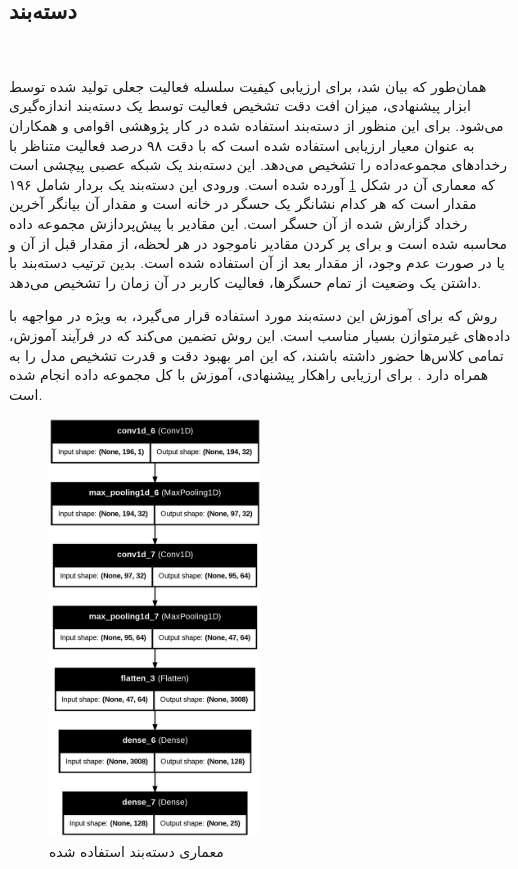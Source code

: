 \subsection{دسته‌بند}‌

همان‌طور که بیان شد، برای ارزیابی کیفیت سلسله فعالیت‌ جعلی تولید شده توسط ابزار پیشنهادی، میزان افت دقت تشخیص فعالیت توسط یک دسته‌بند اندازه‌گیری می‌شود. برای این منظور از دسته‌بند استفاده شده در کار پژوهشی اقوامی و همکاران \cite{x3341} به عنوان معیار ارزیابی استفاده شده است که با دقت ۹۸ درصد فعالیت متناظر با رخدادهای مجموعه‌داده  را تشخیص می‌دهد. این دسته‌بند یک شبکه عصبی پیچشی است که معماری آن در شکل \ref{fig:fO4H5} آورده شده است. ورودی این دسته‌بند یک بردار شامل ۱۹۶ مقدار است که هر کدام نشانگر یک حسگر در خانه است و مقدار آن بیانگر آخرین رخداد گزارش شده از آن حسگر است. این مقادیر با پیش‌پردازش مجموعه داده محاسبه شده است و برای پر کردن مقادیر ناموجود در هر لحظه، از مقدار قبل از آن و یا در صورت عدم وجود، از مقدار بعد از آن استفاده شده است. بدین ترتیب دسته‌بند با داشتن یک وضعیت از تمام حسگرها، فعالیت کاربر در آن زمان را تشخیص می‌دهد.

روش  که برای آموزش این دسته‌بند مورد استفاده قرار می‌گیرد، به‌ ویژه در مواجهه با داده‌های غیرمتوازن بسیار مناسب است. این روش تضمین می‌کند که در فرآیند آموزش، تمامی کلاس‌ها حضور داشته باشند، که این امر بهبود دقت و قدرت تشخیص مدل را به همراه دارد \cite{xx1}. برای ارزیابی راهکار پیشنهادی، آموزش با کل مجموعه داده  انجام شده است.




\begin{figure}[H]
\centerline{\includegraphics[width=0.5\textwidth]{figs/fO4H5.png}}
\caption{معماری دسته‌بند استفاده شده}
\label{fig:fO4H5}
\end{figure}

